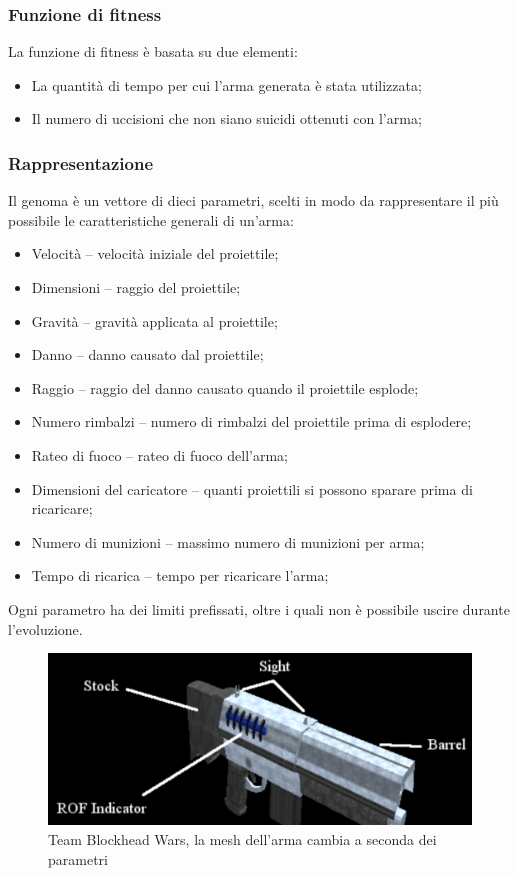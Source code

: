 \documentclass[12pt, italian]{toptesi}
\begin{document}
\subsubsection{Funzione di fitness}

La funzione di fitness è basata su due elementi:
\begin{itemize}
\item La quantità di tempo per cui l'arma generata è stata utilizzata;
\item Il numero di uccisioni che non siano suicidi ottenuti con l'arma;
\end{itemize}

\subsubsection{Rappresentazione}
Il genoma è un vettore di dieci parametri, scelti in modo da rappresentare il più possibile le caratteristiche generali di un'arma:
\begin{itemize}
\item Velocità -- velocità iniziale del proiettile;
\item Dimensioni -- raggio del proiettile;
\item Gravità -- gravità applicata al proiettile;
\item Danno -- danno causato dal proiettile;
\item Raggio -- raggio del danno causato quando il proiettile esplode;
\item Numero rimbalzi -- numero di rimbalzi del proiettile prima di esplodere;
\item Rateo di fuoco -- rateo di fuoco dell'arma;
\item Dimensioni del caricatore -- quanti proiettili si possono sparare prima di ricaricare;
\item Numero di munizioni -- massimo numero di munizioni per arma;
\item Tempo di ricarica -- tempo per ricaricare l'arma;
\end{itemize}
Ogni parametro ha dei limiti prefissati, oltre i quali non è possibile uscire durante l'evoluzione.

\begin{figure}
\centering
\includegraphics[width=1.0\textwidth]{TBHW_1}
\caption{Team Blockhead Wars, la mesh dell'arma cambia a seconda dei parametri}
\label{fig:tbhw}
\end{figure}
\end{document}
